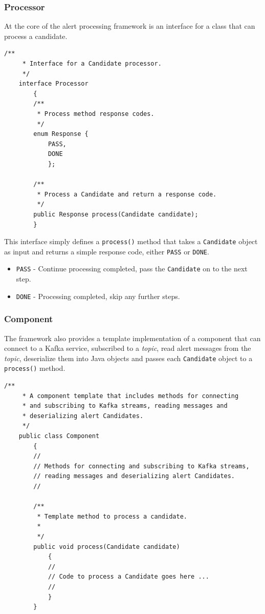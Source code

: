 \documentclass{article}
\newcommand{\kftopic} {\textit{topic}\xspace}
\newcommand{\deserz}    {deserialize\xspace}
\begin{document}
\subsubsection{Processor}
\label{java-interfaces.Processor}

At the core of the alert processing framework is an interface for a class that can process a candidate.

\begin{lstlisting}[style=Java]
    /**
     * Interface for a Candidate processor.
     */
    interface Processor
        {
        /**
         * Process method response codes.
         */
        enum Response {
            PASS,
            DONE
            };

        /**
         * Process a Candidate and return a response code.
         */
        public Response process(Candidate candidate);
        }
\end{lstlisting}

This interface simply defines a \texttt{process()} method that takes a \texttt{Candidate} object as input and
returns a simple response code, either \texttt{PASS} or \texttt{DONE}.

\begin{itemize}
  \item \texttt{PASS} - Continue processing completed, pass the \texttt{Candidate} on to the next step.
  \item \texttt{DONE} - Processing completed, skip any further steps.
\end{itemize}

\subsubsection{Component}
\label{java-interfaces.Component}

The framework also provides a template implementation of a component that can connect to a Kafka service, subscribed to a \kftopic, read alert messages from the \kftopic, \deserz them into Java objects and passes each \texttt{Candidate} object to a \texttt{process()} method.

\begin{lstlisting}[style=Java]
    /**
     * A component template that includes methods for connecting
     * and subscribing to Kafka streams, reading messages and
     * deserializing alert Candidates.
     */
    public class Component
        {
        //
        // Methods for connecting and subscribing to Kafka streams,
        // reading messages and deserializing alert Candidates.
        //

        /**
         * Template method to process a candidate.
         *
         */
        public void process(Candidate candidate)
            {
            //
            // Code to process a Candidate goes here ...
            //
            }
        }
\end{lstlisting}
\end{document}
